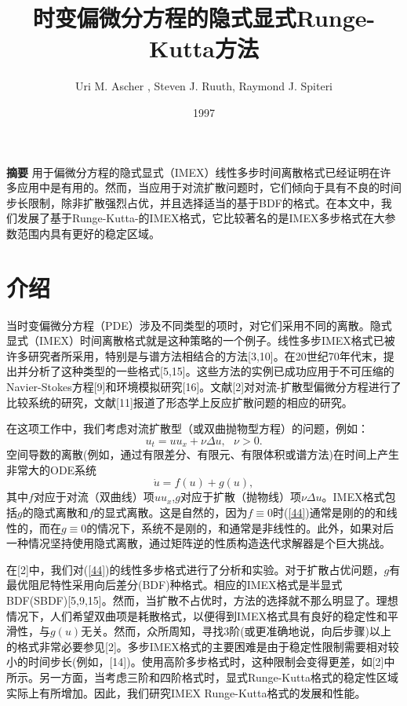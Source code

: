 \documentclass[12pt,a4paper]{article}
\begin{document}
\title{时变偏微分方程的隐式显式Runge-Kutta方法}
\author{Uri M. Ascher , Steven J. Ruuth, Raymond J. Spiteri}
\date{1997}
\maketitle

\textbf{摘要}
用于偏微分方程的隐式显式（IMEX）线性多步时间离散格式已经证明在许多应用中是有用的。然而，当应用于对流扩散问题时，它们倾向于具有不良的时间步长限制，除非扩散强烈占优，并且选择适当的基于BDF的格式。在本文中，我们发展了基于Runge-Kutta-的IMEX格式，它比较著名的是IMEX多步格式在大参数范围内具有更好的稳定区域。

\section{介绍}
当时变偏微分方程（PDE）涉及不同类型的项时，对它们采用不同的离散。隐式显式（IMEX）时间离散格式就是这种策略的一个例子。线性多步IMEX格式已被许多研究者所采用，特别是与谱方法相结合的方法[3,10]。在20世纪70年代末，提出并分析了这种类型的一些格式[5,15]。这些方法的实例已成功应用于不可压缩的Navier-Stokes方程[9]和环境模拟研究[16]。文献[2]对对流-扩散型偏微分方程进行了比较系统的研究，文献[11]报道了形态学上反应扩散问题的相应的研究。

在这项工作中，我们考虑对流扩散型（或双曲抛物型方程）的问题，例如：
\begin{equation}\label{11}
u_{t}=uu_{x}+\nu\Delta u,~~~\nu >0.
\end{equation}
空间导数的离散(例如，通过有限差分、有限元、有限体积或谱方法)在时间上产生非常大的ODE系统
\begin{equation}\label{44}
\dot{u}=f(u)+g(u),
\end{equation}
其中$f$对应于对流（双曲线）项$uu_{x}$,$g$对应于扩散（抛物线）项$\nu\Delta u$。IMEX格式包括$g$的隐式离散和$f$的显式离散。这是自然的，因为$f\equiv 0$时(\ref{44})通常是刚的的和线性的，而在$g\equiv 0$的情况下，系统不是刚的，和通常是非线性的。此外，如果对后一种情况坚持使用隐式离散，通过矩阵逆的性质构造迭代求解器是个巨大挑战。

在[2]中，我们对(\ref{44})的线性多步格式进行了分析和实验。对于扩散占优问题，$g$有最优阻尼特性采用向后差分(BDF)种格式。相应的IMEX格式是半显式BDF(SBDF)[5,9,15]。然而，当扩散不占优时，方法的选择就不那么明显了。理想情况下，人们希望双曲项是耗散格式，以便得到IMEX格式具有良好的稳定性和平滑性，与$g(u)$无关。然而，众所周知，寻找3阶(或更准确地说，向后步骤)以上的格式非常必要参见[2]。多步IMEX格式的主要困难是由于稳定性限制需要相对较小的时间步长(例如，[14])。使用高阶多步格式时，这种限制会变得更差，如[2]中所示。另一方面，当考虑三阶和四阶格式时，显式Runge-Kutta格式的稳定性区域实际上有所增加。因此，我们研究IMEX Runge-Kutta格式的发展和性能。
\end{document}
